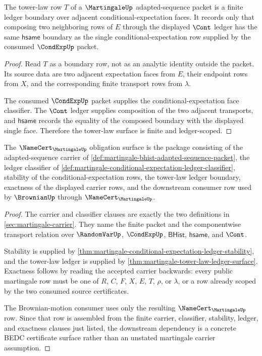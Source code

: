 \begin{theorem}
\label{thm:martingale-tower-law-ledger-surface}
The tower-law row $T$ of a $\MartingaleUp$ adapted-sequence packet is a finite ledger boundary over adjacent conditional-expectation faces. It records only that composing two neighboring rows of $E$ through the displayed $\Cont$ ledger has the same $\mathsf{hsame}$ boundary as the single conditional-expectation row supplied by the consumed $\CondExpUp$ packet.
\end{theorem}
\begin{proof}
Read $T$ as a boundary row, not as an analytic identity outside the packet. Its source data are two adjacent expectation faces from $E$, their endpoint rows from $X$, and the corresponding finite transport rows from $\lambda$.

The consumed $\CondExpUp$ packet supplies the conditional-expectation face classifier. The $\Cont$ ledger supplies composition of the two adjacent transports, and $\mathsf{hsame}$ records the equality of the composed boundary with the displayed single face. Therefore the tower-law surface is finite and ledger-scoped.
\end{proof}

\begin{theorem}
\label{thm:martingale-namecert-obligation-surface}
The $\NameCert_{\MartingaleUp}$ obligation surface is the package consisting of the adapted-sequence carrier of \autoref{def:martingale-bhist-adapted-sequence-packet}, the ledger classifier of \autoref{def:martingale-conditional-expectation-ledger-classifier}, stability of the conditional-expectation rows, the tower-law ledger boundary, exactness of the displayed carrier rows, and the downstream consumer row used by $\BrownianUp$ through $\NameCert_{\MartingaleUp}$.
\end{theorem}
\begin{proof}
The carrier and classifier clauses are exactly the two definitions in \autoref{sec:martingale-carrier}. They name the finite packet and the componentwise transport relation over $\RandomVarUp$, $\CondExpUp$, $\mathsf{BHist}$, $\mathsf{hsame}$, and $\Cont$.

Stability is supplied by \autoref{thm:martingale-conditional-expectation-ledger-stability}, and the tower-law ledger is supplied by \autoref{thm:martingale-tower-law-ledger-surface}. Exactness follows by reading the accepted carrier backwards: every public martingale row must be one of $R$, $C$, $F$, $X$, $E$, $T$, $\rho$, or $\lambda$, or a row already scoped by the two consumed source certificates.

The Brownian-motion consumer uses only the resulting $\NameCert_{\MartingaleUp}$ row. Since that row is assembled from the finite carrier, classifier, stability, ledger, and exactness clauses just listed, the downstream dependency is a concrete BEDC certificate surface rather than an unstated martingale carrier assumption.
\end{proof}

